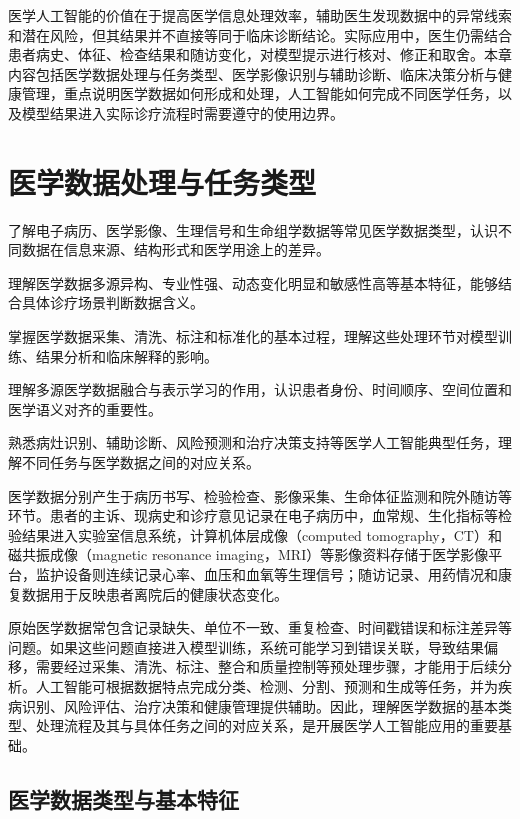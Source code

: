 医学人工智能的价值在于提高医学信息处理效率，辅助医生发现数据中的异常线索和潜在风险，但其结果并不直接等同于临床诊断结论。实际应用中，医生仍需结合患者病史、体征、检查结果和随访变化，对模型提示进行核对、修正和取舍。本章内容包括医学数据处理与任务类型、医学影像识别与辅助诊断、临床决策分析与健康管理，重点说明医学数据如何形成和处理，人工智能如何完成不同医学任务，以及模型结果进入实际诊疗流程时需要遵守的使用边界。


\clearpage
\section{医学数据处理与任务类型}

\begin{sectionkeypoints}
\item 了解电子病历、医学影像、生理信号和生命组学数据等常见医学数据类型，认识不同数据在信息来源、结构形式和医学用途上的差异。
\item 理解医学数据多源异构、专业性强、动态变化明显和敏感性高等基本特征，能够结合具体诊疗场景判断数据含义。
\item 掌握医学数据采集、清洗、标注和标准化的基本过程，理解这些处理环节对模型训练、结果分析和临床解释的影响。
\item 理解多源医学数据融合与表示学习的作用，认识患者身份、时间顺序、空间位置和医学语义对齐的重要性。
\item 熟悉病灶识别、辅助诊断、风险预测和治疗决策支持等医学人工智能典型任务，理解不同任务与医学数据之间的对应关系。
\end{sectionkeypoints}


医学数据分别产生于病历书写、检验检查、影像采集、生命体征监测和院外随访等环节。患者的主诉、现病史和诊疗意见记录在电子病历中，血常规、生化指标等检验结果进入实验室信息系统，计算机体层成像（computed tomography，CT）和磁共振成像（magnetic resonance imaging，MRI）等影像资料存储于医学影像平台，监护设备则连续记录心率、血压和血氧等生理信号；随访记录、用药情况和康复数据用于反映患者离院后的健康状态变化。

原始医学数据常包含记录缺失、单位不一致、重复检查、时间戳错误和标注差异等问题。如果这些问题直接进入模型训练，系统可能学习到错误关联，导致结果偏移，需要经过采集、清洗、标注、整合和质量控制等预处理步骤，才能用于后续分析。人工智能可根据数据特点完成分类、检测、分割、预测和生成等任务，并为疾病识别、风险评估、治疗决策和健康管理提供辅助。因此，理解医学数据的基本类型、处理流程及其与具体任务之间的对应关系，是开展医学人工智能应用的重要基础。


\subsection{医学数据类型与基本特征}

